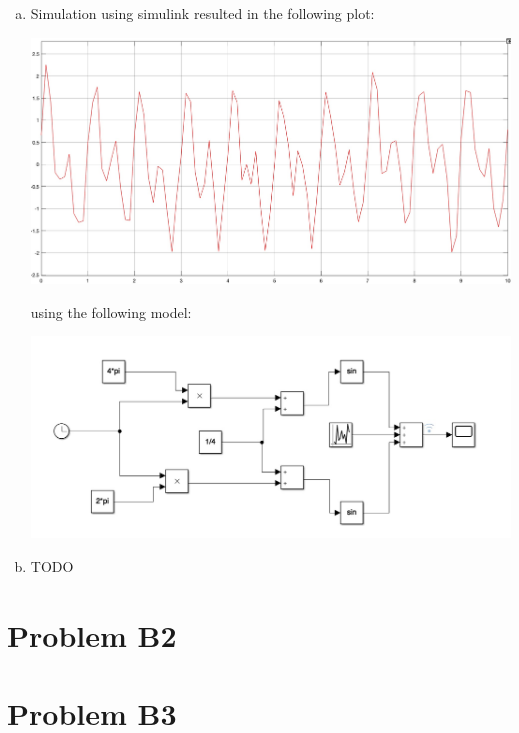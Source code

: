 \documentclass[12pt]{article}
\begin{document}
\begin{enumerate}[a)]

	
	\item Simulation using simulink resulted in the following plot:\\
        \begin{centering}
        \includegraphics[scale = 0.14]{figures/noise_sim}\\
        \end{centering}

        using the following model:\\
        \begin{centering}
        \includegraphics[scale = 0.3]{figures/simulink_1bc}\\
        \end{centering}
	
	\item TODO
	
\end{enumerate}
\section*{Problem B2}


\section*{Problem B3}
\end{document}
